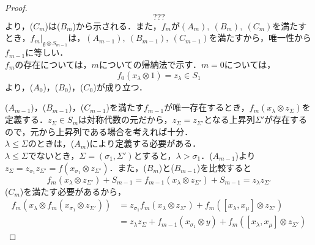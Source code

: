\documentclass[rep_main]{subfiles}
\begin{document}
\begin{proof}
	\begin{equation}
		???
	\end{equation}
	より，($C_m$)は($B_m$)から示される．また，$f_m$が$(A_m),\ (B_m),\ (C_m)$を満たすとき，$f_m|_{\mathfrak{g} \otimes S_{m-1}}$は，$(A_{m-1}),\ (B_{m-1}),\ (C_{m-1})$を満たすから，唯一性から$f_{m-1}$に等しい．\\
	$f_m$の存在については，$m$についての帰納法で示す．$m = 0$については，
	\begin{equation}
		f_0(x_\lambda \otimes 1) = z_\lambda \in S_1
	\end{equation}
	より，($A_0$)，($B_0$)，($C_0$)が成り立つ．
	
	($A_{m-1}$)，($B_{m-1}$)，($C_{m-1}$)を満たす$f_{m-1}$が唯一存在するとき，$f_m(x_\lambda \otimes z_\Sigma)$を定義する．$z_\Sigma \in S_m$は対称代数の元だから，$z_\Sigma = z_{\Sigma'}$となる上昇列$\Sigma'$が存在するので，元から上昇列である場合を考えれば十分．\\
	$\lambda \leq \Sigma$のときは，($A_m$)により定義する必要がある．\\
	$\lambda \leq \Sigma$でないとき，$\Sigma = (\sigma_1, \Sigma')$とすると，$\lambda > \sigma_1$．($A_{m-1}$)より$z_\Sigma = z_{\sigma_1}z_{\Sigma'} = f(x_{\sigma_1} \otimes z_{\Sigma'})$．また，($B_m$)と($B_{m-1}$)を比較すると
	\begin{equation}
		f_m(x_\lambda \otimes z_{\Sigma'}) + S_{m-1}  =  f_{m-1}(x_\lambda \otimes z_{\Sigma'}) + S_{m-1} =  z_\lambda z_{\Sigma'}
	\end{equation}
	($C_m$)を満たす必要があるから，
	\begin{align}
		f_m(x_\lambda \otimes f_m(x_{\sigma_1} \otimes z_{\Sigma'})) &= z_{\sigma_1}f_m(x_\lambda \otimes z_{\Sigma'}) + f_m([x_\lambda, x_\mu] \otimes z_{\Sigma'}) \\
		&= z_\lambda z_\Sigma + f_{m-1}(x_{\sigma_1} \otimes y) + f_m([x_\lambda, x_\mu] \otimes z_{\Sigma'})
	\end{align}
	
\end{proof}
\end{document}
